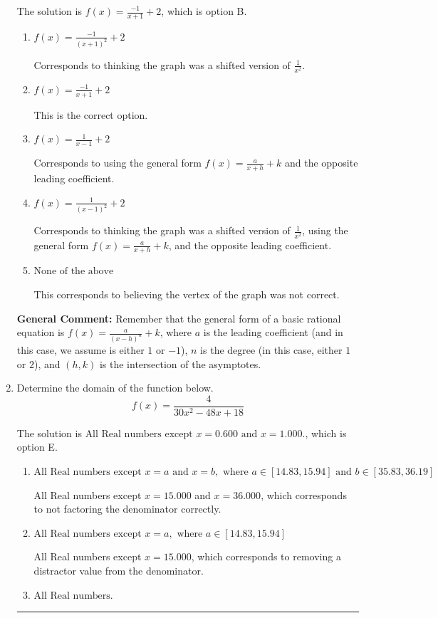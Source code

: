 \documentclass{extbook}[14pt]
\newcommand{\litem}[1]{\item #1

\rule{\textwidth}{0.4pt}}
\begin{document}
\begin{enumerate}
{The solution is \( f(x) = \frac{-1}{x + 1} + 2 \), which is option B.\begin{enumerate}[label=\Alph*.]
\item \( f(x) = \frac{-1}{(x + 1)^2} + 2 \)

Corresponds to thinking the graph was a shifted version of $\frac{1}{x^2}$.
\item \( f(x) = \frac{-1}{x + 1} + 2 \)

This is the correct option.
\item \( f(x) = \frac{1}{x - 1} + 2 \)

Corresponds to using the general form $f(x) = \frac{a}{x+h}+k$ and the opposite leading coefficient.
\item \( f(x) = \frac{1}{(x - 1)^2} + 2 \)

Corresponds to thinking the graph was a shifted version of $\frac{1}{x^2}$, using the general form $f(x) = \frac{a}{x+h}+k$, and the opposite leading coefficient.
\item \( \text{None of the above} \)

This corresponds to believing the vertex of the graph was not correct.
\end{enumerate}

\textbf{General Comment:} Remember that the general form of a basic rational equation is $ f(x) = \frac{a}{(x-h)^n} + k$, where $a$ is the leading coefficient (and in this case, we assume is either $1$ or $-1$), $n$ is the degree (in this case, either $1$ or $2$), and $(h, k)$ is the intersection of the asymptotes.
}
\litem{
Determine the domain of the function below.
\[ f(x) = \frac{4}{30x^{2} -48 x + 18} \]

The solution is \( \text{All Real numbers except } x = 0.600 \text{ and } x = 1.000. \), which is option E.\begin{enumerate}[label=\Alph*.]
\item \( \text{All Real numbers except } x = a \text{ and } x = b, \text{ where } a \in [14.83, 15.94] \text{ and } b \in [35.83, 36.19] \)

All Real numbers except $x = 15.000$ and $x = 36.000$, which corresponds to not factoring the denominator correctly.
\item \( \text{All Real numbers except } x = a, \text{ where } a \in [14.83, 15.94] \)

All Real numbers except $x = 15.000$, which corresponds to removing a distractor value from the denominator.
\item \( \text{All Real numbers.} \)


\end{enumerate}}
\end{enumerate}
\end{document}
